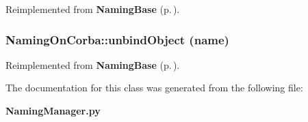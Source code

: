 Reimplemented from {\bf Naming\-Base} {\rm (p.\,\pageref{classNamingBase_NamingBasea1})}.
\subsubsection{\setlength{\rightskip}{0pt plus 5cm}Naming\-On\-Corba::unbind\-Object (name)}\label{classNamingOnCorba_NamingOnCorbaa2}




Reimplemented from {\bf Naming\-Base} {\rm (p.\,\pageref{classNamingBase_NamingBasea2})}.

The documentation for this class was generated from the following file:\begin{CompactItemize}
\item 
{\bf Naming\-Manager.py}\end{CompactItemize}
